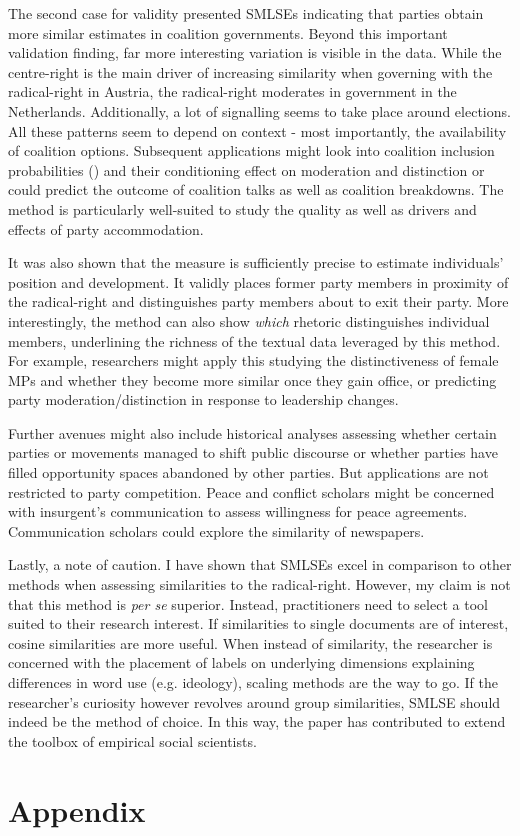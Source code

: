 \documentclass{article}
\begin{document}
The second case for validity presented SMLSEs indicating that parties obtain more similar estimates in coalition governments. Beyond this important validation finding, far more interesting variation is visible in the data. While the centre-right is the main driver of increasing similarity when governing with the radical-right in Austria, the radical-right moderates in government in the Netherlands. Additionally, a lot of signalling seems to take place around elections. All these patterns seem to depend on context - most importantly, the availability of coalition options. Subsequent applications might look into coalition inclusion probabilities (\cite{Kayser2019Coalition}) and their conditioning effect on moderation and distinction or could predict the outcome of coalition talks as well as coalition breakdowns. The method is particularly well-suited to study the quality as well as drivers and effects of party accommodation.\par

It was also shown that the measure is sufficiently precise to estimate individuals' position and development. It validly places former party members in proximity of the radical-right and distinguishes party members about to exit their party. More interestingly, the method can also show \textit{which} rhetoric distinguishes individual members, underlining the richness of the textual data leveraged by this method. For example, researchers might apply this studying the distinctiveness of female MPs and whether they become more similar once they gain office, or predicting party moderation/distinction in response to leadership changes. \par

Further avenues might also include historical analyses assessing whether certain parties or movements managed to shift public discourse or whether parties have filled opportunity spaces abandoned by other parties. But applications are not restricted to party competition. Peace and conflict scholars might be concerned with insurgent's communication to assess willingness for peace agreements. Communication scholars could explore the similarity of newspapers. \par

Lastly, a note of caution. I have shown that SMLSEs excel in comparison to other methods when assessing similarities to the radical-right. However, my claim is not that this method is \textit{per se} superior. Instead, practitioners need to select a tool suited to their research interest. If similarities to single documents are of interest, cosine similarities are more useful. When instead of similarity, the researcher is concerned with the placement of labels on underlying dimensions explaining differences in word use (e.g. ideology), scaling methods are the way to go. If the researcher's curiosity however revolves around group similarities, SMLSE should indeed be the method of choice. In this way, the paper has contributed to extend the toolbox of empirical social scientists. \par




\printbibliography

\newpage

\section*{Appendix}


\end{document}
